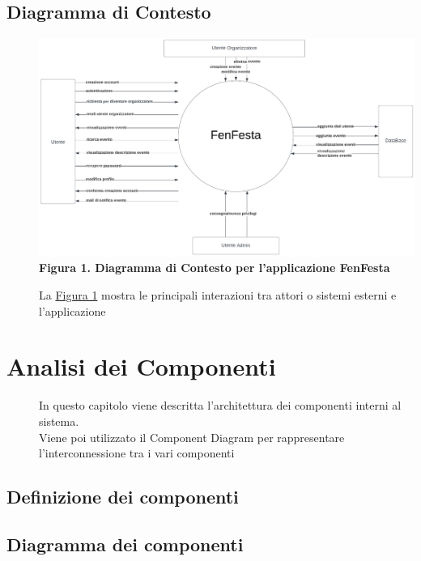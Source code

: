 \documentclass{article}
\begin{document}
\subsection{Diagramma di Contesto}
\begin{description}
    \item[] \includegraphics[scale=0.38]{Context.png}
        \textbf{Figura 1. Diagramma di Contesto per l'applicazione FenFesta} \label{fig:1}
    \item[] La \hyperref[fig:1]{Figura 1} mostra le principali interazioni tra attori o sistemi esterni e l'applicazione
\end{description}
\clearpage
\section{Analisi dei Componenti}
\begin{description}
    \item[] In questo capitolo viene descritta l'architettura dei componenti interni al sistema. \\ 
    Viene poi utilizzato il Component Diagram per rappresentare l'interconnessione tra i vari componenti
\end{description}
\subsection{Definizione dei componenti}
\begin{description}
    \item[]
\end{description}
\subsection{Diagramma dei componenti}
\begin{description}
    \item[] 
\end{description}
\end{document}
